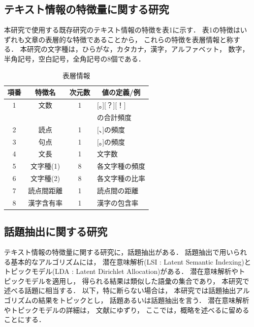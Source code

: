 \documentclass[12pt,a4paper,twocolumn,twoside]{jsik}
\begin{document}
\subsection{テキスト情報の特徴量に関する研究}\label{FEATURE}
本研究で使用する既存研究のテキスト情報の特徴を表1に示す．
%
表1の特徴はいずれも文章の表層的な特徴であることから，
これらの特徴を表層情報と称する．
%
本研究の文字種は，ひらがな，カタカナ，漢字，アルファベット，
数字，半角記号，空白記号，全角記号の8個である．

\renewcommand\thefootnote{\fnsymbol{footnote}}
%
\begin{table}[htb]
  \caption{表層情報}
  \label{tab:dics_tag}
  \begin{center}
  \begin{tabular}{|c|c|c|l|} \hline
    {\bf 項番} & {\bf 特徴名} & {\bf 次元数} & \multicolumn{1}{|c|}{\bf 値の定義/例} \\ \hline\hline
   1 & 文数 & 1 & [。][？][！] \\
     &  &  & の合計頻度 \\ \hline
   2 & 読点 & 1 &  [、]の頻度 \\ \hline
   3 & 句点 & 1 & [。]の頻度 \\ \hline
   4 & 文長 & 1 & 文字数 \\ \hline
   5 & 文字種(1) & 8 & 各文字種の頻度\footnotemark[1] \\ \hline
   6 & 文字種(2) & 8 & 各文字種の比率\footnotemark[1] \\ \hline
   7 & 読点間距離 & 1 & 読点間の距離\cite{punctuation_mark} \\ \hline
   8 & 漢字含有率 & 1 & 漢字の包含率\cite{punctuation_mark} \\ \hline
  \end{tabular}
  \end{center}
\end{table}
%
%
\renewcommand\thefootnote{\arabicl{footnote}}

\subsection{話題抽出に関する研究}\label{TOPIC}
テキスト情報の特徴量に関する研究に，話題抽出がある．
話題抽出で用いられる基本的なアルゴリズムには，
潜在意味解析(LSI : Latent Semantic Indexing)と
トピックモデル(LDA : Latent Dirichlet Allocation)がある\cite{topic_book}．
%
潜在意味解析やトピックモデルを適用し，
得られる結果は類似した語彙の集合であり，
本研究で述べる話題に相当する．
以下，特に断らない場合は，
本研究では話題抽出アルゴリズムの結果をトピックとし，
話題あるいは話題抽出を言う．
%
潜在意味解析やトピックモデルの詳細は，
文献\cite{topic_book}にゆずり，
ここでは，概略を述べるに留めることにする．
\end{document}
